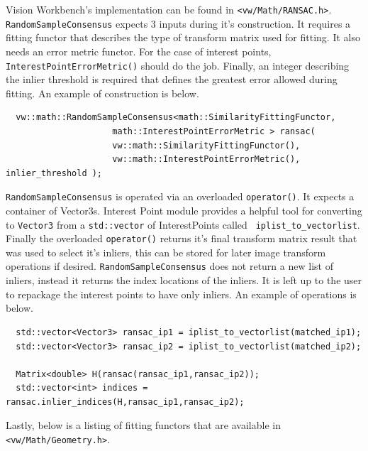 Vision Workbench's implementation can be found in 
{\tt <vw/Math/RANSAC.h>}. {\tt RandomSampleConsensus} expects 3 inputs
during it's construction. It requires a fitting functor that describes
the type of transform matrix used for fitting. It also needs an error
metric functor. For the case of interest points, 
{\tt InterestPointErrorMetric()} should do the job. Finally, an integer
describing the inlier threshold is required that defines the greatest
error allowed during fitting. An example of construction is below.

\begin{verbatim}
  vw::math::RandomSampleConsensus<math::SimilarityFittingFunctor,
                     math::InterestPointErrorMetric > ransac(
                     vw::math::SimilarityFittingFunctor(),
                     vw::math::InterestPointErrorMetric(), inlier_threshold );
\end{verbatim}

{\tt RandomSampleConsensus} is operated via an overloaded {\tt operator()}. 
It expects a container of Vector3s. Interest Point
module provides a helpful tool for converting to {\tt Vector3} from a
{\tt std::vector} of InterestPoints called {\tt
  iplist\_to\_vectorlist}. Finally the overloaded {\tt operator()} returns
it's final transform matrix result that was used to select it's
inliers, this can be stored for later image transform operations if
desired. {\tt RandomSampleConsensus} does not return a new list of inliers,
instead it returns the index locations of the inliers. It is left up
to the user to repackage the interest points to have only inliers. An
example of operations is below.

\begin{verbatim}
  std::vector<Vector3> ransac_ip1 = iplist_to_vectorlist(matched_ip1);
  std::vector<Vector3> ransac_ip2 = iplist_to_vectorlist(matched_ip2);
  
  Matrix<double> H(ransac(ransac_ip1,ransac_ip2));
  std::vector<int> indices = ransac.inlier_indices(H,ransac_ip1,ransac_ip2);
\end{verbatim}

Lastly, below is a listing of fitting functors that are available in
{\tt <vw/Math/Geometry.h>}.

